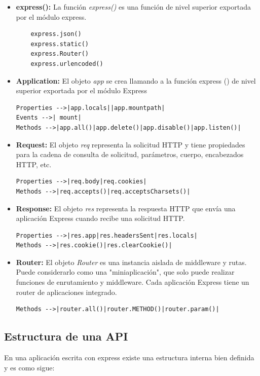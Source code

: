 \begin{itemize}

\item \textbf{express():} La función \textit{express()} es una función de nivel superior exportada por el módulo express.
\begin{lstlisting}
    express.json()
    express.static()
    express.Router()
    express.urlencoded()
\end{lstlisting}
\item \textbf{Application:} El objeto \textit{app} se crea llamando a la función express () de nivel superior exportada por el módulo Express
\begin{lstlisting}
Properties -->|app.locals||app.mountpath|
Events -->| mount|
Methods -->|app.all()|app.delete()|app.disable()|app.listen()|
\end{lstlisting}
\item \textbf{Request:} El objeto \textit{req} representa la solicitud HTTP y tiene propiedades para la cadena de consulta de solicitud, parámetros, cuerpo, encabezados HTTP, etc.
\begin{lstlisting}
Properties -->|req.body|req.cookies|
Methods -->|req.accepts()|req.acceptsCharsets()|
\end{lstlisting}
\item \textbf{Response:} El objeto \textit{res} representa la respuesta HTTP que envía una aplicación Express cuando recibe una solicitud HTTP.
\begin{lstlisting}
Properties -->|res.app|res.headersSent|res.locals|
Methods -->|res.cookie()|res.clearCookie()|
\end{lstlisting}
\item \textbf{Router:} El objeto \textit{Router} es una instancia aislada de middleware y rutas. Puede considerarlo como una "miniaplicación", que solo puede realizar funciones de enrutamiento y middleware. Cada aplicación Express tiene un router de aplicaciones integrado.
\begin{lstlisting}
Methods -->|router.all()|router.METHOD()|router.param()|
\end{lstlisting}
\end{itemize}


\subsection{Estructura de una API}

En una aplicación escrita con express existe una estructura interna bien definida y es como sigue:


